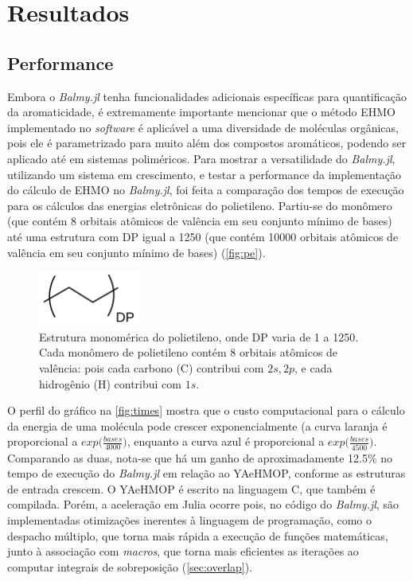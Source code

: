 \chapter{Resultados}

\section{Performance}

Embora o \textit{Balmy.jl} tenha funcionalidades adicionais específicas para quantificação da aromaticidade, é extremamente importante mencionar que o método \gls{EHMO} implementado no \textit{software} é aplicável a uma diversidade de moléculas orgânicas, pois ele é parametrizado para muito além dos compostos aromáticos, podendo ser aplicado até em sistemas poliméricos. Para mostrar a versatilidade do \textit{Balmy.jl}, utilizando um sistema em crescimento, e testar a performance da implementação do cálculo de \gls{EHMO} no \textit{Balmy.jl}, foi feita a comparação dos tempos de execução para os cálculos das energias eletrônicas do polietileno. Partiu-se do monômero (que contém 8 orbitais atômicos de valência em seu conjunto mínimo de bases) até uma estrutura com \gls{DP} igual a 1250 (que contém 10000 orbitais atômicos de valência em seu conjunto mínimo de bases) (\autoref{fig:pe}).

\begin{figure}[htb]
\caption{\label{fig:pe} Estrutura monomérica do polietileno, onde \gls{DP} varia de 1 a 1250. Cada monômero de polietileno contém 8 orbitais atômicos de valência: pois cada carbono (C) contribui com $2s, 2p$, e cada hidrogênio (H) contribui com $1s$.}
	\begin{center}
		\includegraphics[width=0.3\textwidth]{images/pe.png}
	\end{center}
\end{figure}

O perfil do gráfico na \autoref{fig:times} mostra que o custo computacional para o cálculo da energia de uma molécula pode crescer exponencialmente (a curva laranja é proporcional a $\textit{exp}\bigg({\displaystyle \frac{bases}{4000}}\bigg)$, enquanto a curva azul é proporcional a $\textit{exp}\bigg({\displaystyle \frac{bases}{4500}} \bigg)$. Comparando as duas, nota-se que há um ganho de aproximadamente 12.5\% no tempo de execução do \textit{Balmy.jl} em relação ao \gls{YAeHMOP}, conforme as estruturas de entrada crescem. O \gls{YAeHMOP} é escrito na linguagem C, que também é compilada. Porém, a aceleração em Julia ocorre pois, no código do \textit{Balmy.jl}, são implementadas otimizações inerentes à linguagem de programação, como o despacho múltiplo, que torna mais rápida a execução de funções matemáticas, junto à associação com \textit{macros}, que torna mais eficientes as iterações ao computar integrais de sobreposição (\autoref{sec:overlap}).

